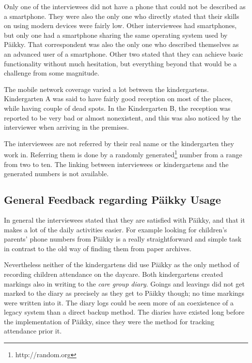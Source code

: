 Only one of the interviewees did not have a phone that could not be described as a smartphone. They were also the only one who directly stated that their skills on using modern devices were fairly low. Other interviewees had smartphones, but only one had a smartphone sharing the same operating system used by Päikky. That correspondent was also the only one who described themselves as an advanced user of a smartphone. Other two stated that they can achieve basic functionality without much hesitation, but everything beyond that would be a challenge from some magnitude. 

The mobile network coverage varied a lot between the kindergartens. Kindergarten A was said to  have fairly good reception on most of the places, while having couple of dead spots. In the Kindergarten B, the reception was reported to be very bad or almost nonexistent, and this was also noticed by the interviewer when arriving in the premises. 

The interviewees are not referred by their real name or the kindergarten they work in. Referring them is done by a randomly generated\footnote{http://random.org} number from a range from two to ten. The linking between interviewees or kindergartens and the generated numbers is not available.



\subsection{General Feedback regarding Päikky Usage}

In general the interviewees stated that they are satisfied with Päikky, and that it makes a lot of the daily activities easier. For example looking for children's parents' phone numbers from Päikky is a really straightforward and simple task in contrast to the old way of finding them from paper archives. 

Nevertheless neither of the kindergartens did use Päikky as the only method of recording children attendance on the daycare. Both kindergartens created markings also in writing to the \textit{care group diary}. Goings and leavings did not get marked to the diary as precisely as they get to Päikky though; no time markings were written into it. The diary logs could be seen more of an coexistence of a legacy system than a direct backup method. The diaries have existed long before the implementation of Päikky, since they were the method for tracking attendance prior it. 

